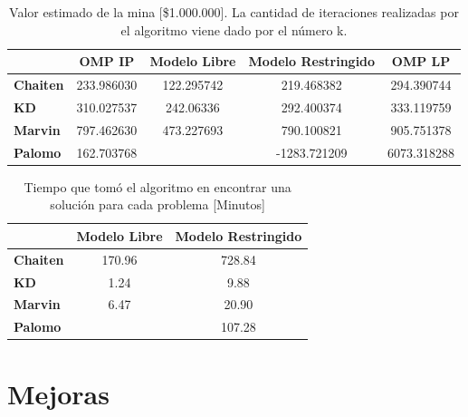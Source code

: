 \documentclass[12pt,letterpaper]{article}
\begin{document}
\begin{table}[H]
\centering
\begin{tabular}{|l|cccc|}
\hline
                 & \textbf{OMP IP} & \textbf{Modelo Libre} & \textbf{Modelo Restringido} & \textbf{OMP LP} \\ \hline
\textbf{Chaiten} &     233.986030               & 122.295742             & 219.468382                      &          294.390744           \\ \hline
\textbf{KD}      & 310.027537                 & 242.06336              & 292.400374                     & 333.119759
                    \\ \hline
\textbf{Marvin}  & 797.462630
                  & 473.227693               & 790.100821                     &  905.751378
                \\ \hline
\textbf{Palomo}  & 162.703768
                  &              &  -1283.721209                     &  6073.318288
                  \\ \hline
\end{tabular}
\caption{Valor estimado de la mina [\$1.000.000]. La cantidad de iteraciones realizadas por el algoritmo viene dado por el número k.}
\end{table}

\begin{table}[H]
\centering
\begin{tabular}{|l|cc|}
\hline
                 & \textbf{Modelo Libre} & \textbf{Modelo Restringido} \\ \hline
\textbf{Chaiten} & 170.96                & 728.84                      \\ \hline
\textbf{KD}      & 1.24                  & 9.88                        \\ \hline
\textbf{Marvin}  & 6.47                  & 20.90                       \\ \hline
\textbf{Palomo}  &                       & 107.28                      \\ \hline
\end{tabular}
\caption{Tiempo que tomó el algoritmo en encontrar una solución para cada problema [Minutos]}
\end{table}

\section{Mejoras}
\end{document}
